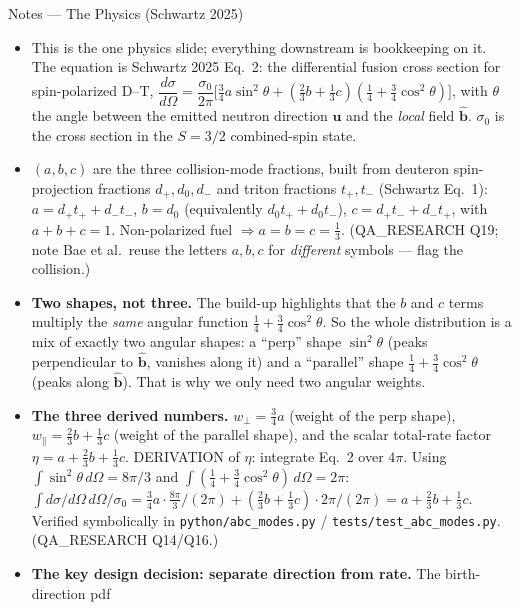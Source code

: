 \documentclass[11pt,aspectratio=169]{beamer}
\newcommand{\bhat}{\hat{\mathbf{b}}}
\begin{document}
\begin{frame}[allowframebreaks]{Notes --- The Physics (Schwartz 2025)}
{\color{red}\footnotesize
\begin{itemize}
\item This is the one physics slide; everything downstream is bookkeeping on it. The equation is
      Schwartz 2025 Eq.\ 2: the differential fusion cross section for spin-polarized D--T,
      $\dfrac{d\sigma}{d\Omega} = \dfrac{\sigma_0}{2\pi}\big[\tfrac34 a\sin^2\theta +
      (\tfrac23 b+\tfrac13 c)(\tfrac14+\tfrac34\cos^2\theta)\big]$, with $\theta$ the angle
      between the emitted neutron direction $\mathbf{u}$ and the \emph{local} field $\bhat$.
      $\sigma_0$ is the cross section in the $S=3/2$ combined-spin state.
\item $(a,b,c)$ are the three collision-mode fractions, built from deuteron spin-projection
      fractions $d_+,d_0,d_-$ and triton fractions $t_+,t_-$ (Schwartz Eq.\ 1):
      $a=d_+t_+ + d_-t_-$, $b=d_0$ (equivalently $d_0t_+ + d_0t_-$), $c=d_+t_- + d_-t_+$, with
      $a+b+c=1$. Non-polarized fuel $\Rightarrow a=b=c=\tfrac13$. (QA\_RESEARCH Q19; note Bae et
      al.\ reuse the letters $a,b,c$ for \emph{different} symbols --- flag the collision.)
\item \textbf{Two shapes, not three.} The build-up highlights that the $b$ and $c$ terms multiply
      the \emph{same} angular function $\tfrac14+\tfrac34\cos^2\theta$. So the whole distribution
      is a mix of exactly two angular shapes: a ``perp'' shape $\sin^2\theta$ (peaks perpendicular
      to $\bhat$, vanishes along it) and a ``parallel'' shape $\tfrac14+\tfrac34\cos^2\theta$
      (peaks along $\bhat$). That is why we only need two angular weights.
\item \textbf{The three derived numbers.} $w_\perp=\tfrac34 a$ (weight of the perp shape),
      $w_\parallel=\tfrac23 b+\tfrac13 c$ (weight of the parallel shape), and the scalar total-rate
      factor $\eta = a+\tfrac23 b+\tfrac13 c$. DERIVATION of $\eta$: integrate Eq.\ 2 over $4\pi$.
      Using $\int\sin^2\theta\,d\Omega = 8\pi/3$ and $\int(\tfrac14+\tfrac34\cos^2\theta)\,
      d\Omega = 2\pi$: $\int d\sigma/d\Omega\,d\Omega/\sigma_0 = \tfrac34 a\cdot\tfrac{8\pi}{3}/
      (2\pi) + (\tfrac23 b+\tfrac13 c)\cdot 2\pi/(2\pi) = a + \tfrac23 b + \tfrac13 c$. Verified
      symbolically in \texttt{python/abc\_modes.py} / \texttt{tests/test\_abc\_modes.py}.
      (QA\_RESEARCH Q14/Q16.)
\item \textbf{The key design decision: separate direction from rate.} The birth-direction pdf

\end{itemize}}
\end{frame}
\end{document}

